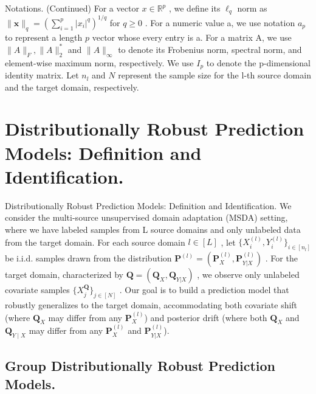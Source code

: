 \documentclass{beamer}
\begin{document}
\begin{frame}{Notations. (Continued)}
    For a vector $x \in \mathbb { R } ^ { p }$ , we define its $\ell _ { q }$ norm as $\| \boldsymbol { x } \| _ { q } = ( \sum _ { i = 1 } ^ { p } | x _ { i } | ^ { q } ) ^ { 1 / q }$ for $q \geq 0$ . For a numeric value a, we use notation $a _ { p }$ to represent a length $p$ vector whose every entry is a. For a matrix A, we use $\| A \| _ { F } , \| A \| _ { 2 } ^ { * }$ and $\| A \| _ { \infty }$ to denote its Frobenius norm, spectral norm, and element-wise maximum norm, respectively. We use $I _ { p }$ to denote the p-dimensional identity matrix. Let $n _ { l }$ and $N$ represent the sample size for the l-th source domain and the target domain, respectively.
\end{frame}

\section{Distributionally Robust Prediction Models: Definition and Identification.}

\begin{frame}{Distributionally Robust Prediction Models: Definition and Identification.}
    We consider the multi-source unsupervised domain adaptation (MSDA) setting, where we have labeled samples from L source domains and only unlabeled data from the target domain. For each source domain $l \in [ L ]$ , let $\{ X _ { i } ^ { ( l ) } , Y _ { i } ^ { ( l ) } \} _ { i \in [ n _ { l } ] }$ be i.i.d. samples drawn from the distribution $\mathbf { P } ^ { ( l ) } = ( \mathbf { P } _ { X } ^ { ( l ) } , \mathbf { P } _ { Y | X } ^ { ( l ) } )$ . For the target domain, characterized by $\mathbf { Q } = ( \mathbf { Q } _ { X } , \mathbf { Q } _ { Y | X } )$ , we observe only unlabeled covariate samples $\{ X _ { j } ^ { \mathbf { Q } } \} _ { j \in [ N ] }$ . Our goal is to build a prediction model that robustly generalizes to the target domain, accommodating both covariate shift (where $\mathbf { Q } _ { X }$ may differ from any $\mathbf { P } _ { X } ^ { ( l ) }$) and posterior drift (where both $\mathbf { Q } _ { X }$ and $\mathbf { Q } _ { Y \mid X }$ may differ from any $\mathbf { P } _ { X } ^ { ( l ) }$ and $\mathbf { P } _ { Y | X } ^ { ( l ) }$).
\end{frame}

\subsection{Group Distributionally Robust Prediction Models.}
\end{document}
